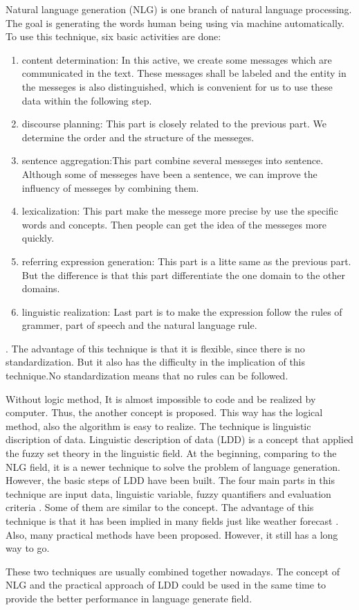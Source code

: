 Natural language generation (NLG) is one branch of natural language processing. 
The goal is generating the words human being using via machine automatically. 
To use this technique, six basic activities are done: 
\begin{enumerate}
	\item content determination: In this active, we create some messages which are communicated in the text. 
	These messages shall be labeled and the entity in the messeges is also distinguished, which is convenient for us to 
	use these data within the following step.
	\item discourse planning: This part is closely related to the previous part. 
	We determine the order and the structure of the messeges.
	\item sentence aggregation:This part combine several messeges into sentence. 
	Although some of messeges have been a sentence, we can improve the influency of messeges by combining them.
	\item lexicalization: This part make the messege more precise by use the specific words and concepts. 
	Then people can get the idea of the messeges more quickly.
	\item referring expression generation: This part is a litte same as the previous part. 
	But the difference is that this part differentiate the one domain to the other domains.
	\item linguistic realization: Last part is to make the expression follow the rules of grammer, part of speech and the natural language rule.
\end{enumerate}
\cite{aramossoto2016onthe}. 
The advantage of this technique is that it is flexible, since there is no standardization. 
But it also has the difficulty in the implication of this technique.\cite{aramossoto2016onthe}No standardization means that 
no rules can be followed. 

Without logic method, It is almost impossible to code and be realized by computer.
Thus, the another concept is proposed. This way has the logical method, also the algorithm is easy to realize.
The technique is linguistic discription of data.
Linguistic description of data (LDD) is a concept that applied the fuzzy set theory in the linguistic field. 
At the beginning, comparing to the NLG field, it is a newer technique to solve the problem of language generation. 
However, the basic steps of LDD have been built. 
The four main parts in this technique are input data, linguistic variable, fuzzy quantifiers and evaluation criteria \cite{aramossoto2016onthe}. 
Some of them are similar to the concept. 
The advantage of this technique is that it has been implied in many fields just like weather forecast \cite{Ramos-SotoBBT14}. 
Also, many practical methods have been proposed. 
However, it still has a long way to go.

These two techniques are usually combined together nowadays. 
The concept of NLG and the practical approach of LDD could be used in the same time to provide the better performance in language generate field.

\newpage %